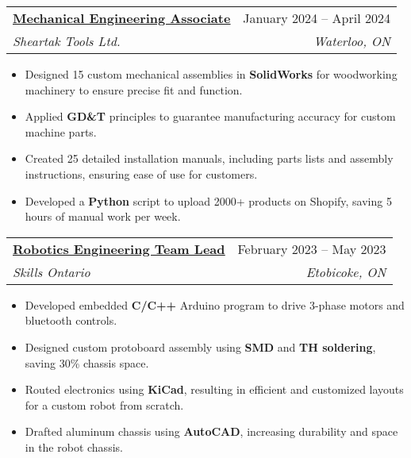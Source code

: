 \documentclass[letterpaper]{article}
\makeatletter
\newcommand{\resumeItem}[1]{
  \item\small{
    {#1 \vspace{-2pt}}
  }
}
\newcommand{\resumeSubheading}[4]{
  \vspace{-2pt}\item
    \begin{tabular*}{0.97\textwidth}[t]{l@{\extracolsep{\fill}}r}
      \textbf{#1} & #2 \\
      \textit{\small#3} & \textit{\small #4} \\
    \end{tabular*}\vspace{-7pt}
}
\newcommand{\resumeItemListStart}{\begin{itemize}}
\newcommand{\resumeItemListEnd}{\end{itemize}\vspace{-5pt}}
\makeatother
\begin{document}

\resumeSubheading
{\href{https://www.gavintranquilino.com/sheartak.html}{\underline{Mechanical Engineering Associate}}}{January 2024 -- April 2024}
{Sheartak Tools Ltd.}{Waterloo, ON}
\resumeItemListStart
\resumeItem{Designed 15 custom mechanical assemblies in \textbf{SolidWorks} for woodworking machinery to ensure precise fit and function.}
\resumeItem{Applied \textbf{GD\&T} principles to guarantee manufacturing accuracy for custom machine parts.}
\resumeItem{Created 25 detailed installation manuals, including parts lists and assembly instructions, ensuring ease of use for customers.}
\resumeItem{Developed a \textbf{Python} script to upload 2000+ products on Shopify, saving 5 hours of manual work per week.}
\resumeItemListEnd


\resumeSubheading
{\href{https://www.gavintranquilino.com/hockey-robot.html}{\underline{Robotics Engineering Team Lead}}}{February 2023 -- May 2023}
{Skills Ontario}{Etobicoke, ON}
\resumeItemListStart
\resumeItem{Developed embedded \textbf{C/C++} Arduino program to drive 3-phase motors and bluetooth controls.}
\resumeItem{Designed custom protoboard assembly using \textbf{SMD} and \textbf{TH soldering}, saving 30\% chassis space.}
\resumeItem{Routed electronics using \textbf{KiCad}, resulting in efficient and customized layouts for a custom robot from scratch.}
\resumeItem{Drafted aluminum chassis using \textbf{AutoCAD}, increasing durability and space in the robot chassis.}
\resumeItemListEnd
\end{document}
